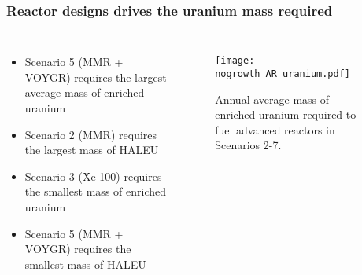 \begin{frame}
    \frametitle{Reactor designs drives the uranium mass required}
    \begin{columns}
        \column[t]{4.5cm}
            \begin{itemize}
                \item Scenario 5 (MMR + VOYGR) requires the largest average mass of 
                      enriched uranium
                \item Scenario 2 (MMR) requires the largest mass of \gls{HALEU}
                \item Scenario 3 (Xe-100) requires the smallest mass of enriched 
                      uranium
                \item Scenario 5 (MMR + VOYGR) requires the smallest mass of \gls{HALEU}
            \end{itemize}
        \column[t]{5.5cm}
        \vspace{-0.8cm}
            \begin{figure}
                \centering
                \texttt{[image: nogrowth\_AR\_uranium.pdf]}
                \caption{Annual average mass of enriched uranium required to fuel
                advanced reactors in Scenarios 2-7.}
                \label{fig:uranium}

        \end{figure}
    \end{columns}
\end{frame}

